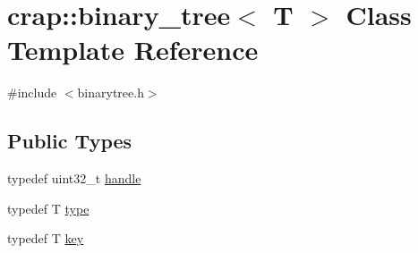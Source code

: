 \hypertarget{classcrap_1_1binary__tree}{\section{crap\+:\+:binary\+\_\+tree$<$ T $>$ Class Template Reference}
\label{classcrap_1_1binary__tree}
}


{\ttfamily \#include $<$binarytree.\+h$>$}

\subsection*{Public Types}
\begin{DoxyCompactItemize}
\item 
typedef uint32\+\_\+t \hyperlink{classcrap_1_1binary__tree_a750a57d699f2974e6a5415300a9696ff}{handle}
\item 
typedef T \hyperlink{classcrap_1_1binary__tree_a9d33f412f5a24d3201de18e8c531143d}{type}
\item 
typedef T \hyperlink{classcrap_1_1binary__tree_ac119732cd07f83ed5161ebc86d0e31c6}{key}
\end{DoxyCompactItemize}
